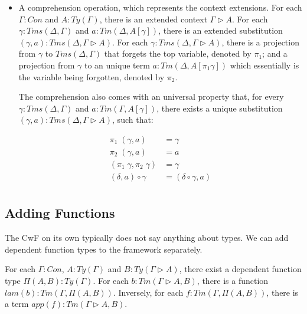 {\begin{itemize}
{  Functoriality of $Ty$:

  \begin{align*}
    a [id_{\Gamma}] & = a \\
    a [\gamma \circ \delta] & = a [\gamma] [\delta] \\
  \end{align*}
  }

\item{A comprehension operation, which represents the context extensions. For each $\Gamma : Con$ and $A : Ty(\Gamma)$, there is an extended context $\Gamma \triangleright A$. For each $\gamma : Tms (\Delta, \Gamma)$ and $a : Tm (\Delta, A[\gamma])$, there is an extended substitution $(\gamma, a) : Tms (\Delta, \Gamma \triangleright A)$. For each $\gamma : Tms (\Delta, \Gamma \triangleright A)$, there is a projection from $\gamma$ to $Tms (\Delta, \Gamma)$ that forgets the top variable, denoted by $\pi_1$; and a projection from $\gamma$ to an unique term $a : Tm (\Delta, A[\pi_1 \gamma])$ which essentially is the variable being forgotten, denoted by $\pi_2$.

The comprehension also comes with an universal property that, for every $\gamma : Tms (\Delta, \Gamma)$ and $a : Tm(\Gamma , A[\gamma])$, there exists a unique substitution $(\gamma, a) : Tms (\Delta, \Gamma \triangleright A)$, such that:

  \begin{align*}
    \pi_1\;(\gamma, a) & = \gamma \\
    \pi_2\;(\gamma, a) & = a \\
    (\pi_1\;\gamma , \pi_2\;\gamma) & = \gamma \\
    (\delta, a) \circ \gamma & = (\delta \circ \gamma , a) \\
  \end{align*}
  }
  
\end{itemize}

\subsection{Adding Functions}

The CwF on its own typically does not say anything about types. We can add dependent function types to the framework separately.

For each $\Gamma : Con$, $A : Ty(\Gamma)$ and $B : Ty(\Gamma \triangleright A)$, there exist a dependent function type $\Pi (A, B) : Ty(\Gamma)$. For each $b : Tm(\Gamma \triangleright A, B)$, there is a function $lam(b) : Tm (\Gamma, \Pi (A, B))$. Inversely, for each $f : Tm(\Gamma, \Pi (A, B))$, there is a term $app(f) : Tm(\Gamma \triangleright A, B)$.

}
